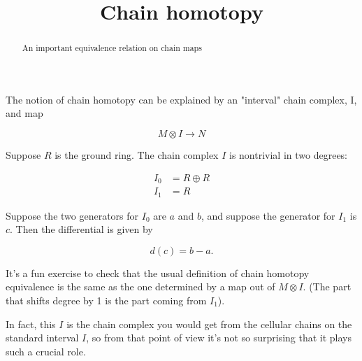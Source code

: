 \documentclass[nooutcomes]{ximera}
\title{Chain homotopy}
\begin{document}
\begin{abstract}
  An important equivalence relation on chain maps
\end{abstract}
\maketitle

The notion of chain homotopy can be explained by an "interval" chain
complex, I, and map

\[
M \otimes I \to N
\]

Suppose $R$ is the ground ring.  The chain complex $I$ is nontrivial in two degrees:

\begin{align*}
I_0 & = R \oplus R\\
I_1 & = R
\end{align*}

Suppose the two generators for $I_0$ are $a$ and $b$, and suppose the
generator for $I_1$ is $c$.  Then the differential is given by

\[
d(c) = b - a.
\]

It's a fun exercise to check that the usual definition of chain
homotopy equivalence is the same as the one determined by a map out of
$M \otimes I$.  (The part that shifts degree by 1 is the part coming
from $I_1$).

In fact, this $I$ is the chain complex you would get from the cellular
chains on the standard interval $I$, so from that point of view it's
not so surprising that it plays such a crucial role.
\end{document}
